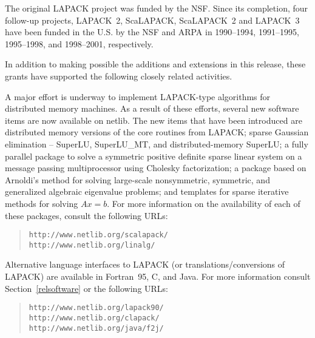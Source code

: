 The original LAPACK project was funded by the NSF. Since its completion,
four follow-up projects, LAPACK~2, ScaLAPACK, ScaLAPACK~2 and LAPACK~3 have
been funded in the U.S. by the NSF and ARPA in 1990--1994, 1991--1995,
1995--1998, and 1998--2001, respectively.  

In addition to making possible
the additions and extensions in this release, these grants have 
supported the following closely related activities.

A major effort is underway
to implement LAPACK-type algorithms for distributed memory
 machines.
As a result of these efforts,
several new software items are now available on netlib.  The new
items that have been introduced are distributed memory versions of the
core routines from LAPACK; sparse Gaussian elimination -- SuperLU, SuperLU\_MT,
and distributed-memory SuperLU; a fully parallel package to solve a symmetric
positive definite sparse linear system on a message passing
multiprocessor using Cholesky factorization; a package based on
Arnoldi's method for solving large-scale nonsymmetric, symmetric, and
generalized algebraic eigenvalue problems; 
and templates for sparse
iterative methods for solving $Ax=b$.
For more information on the
availability of each of these packages, consult the following URLs:
\begin{quote}
{\tt http://www.netlib.org/scalapack/} \\
{\tt http://www.netlib.org/linalg/}
\end{quote}

Alternative language interfaces to LAPACK (or translations/conversions
of LAPACK) are available in Fortran~95, C, and Java. 
For more information consult Section~\ref{relsoftware} or the following URLs:
\begin{quote}
{\tt http://www.netlib.org/lapack90/} \\
{\tt http://www.netlib.org/clapack/} \\
{\tt http://www.netlib.org/java/f2j/}
\end{quote}

